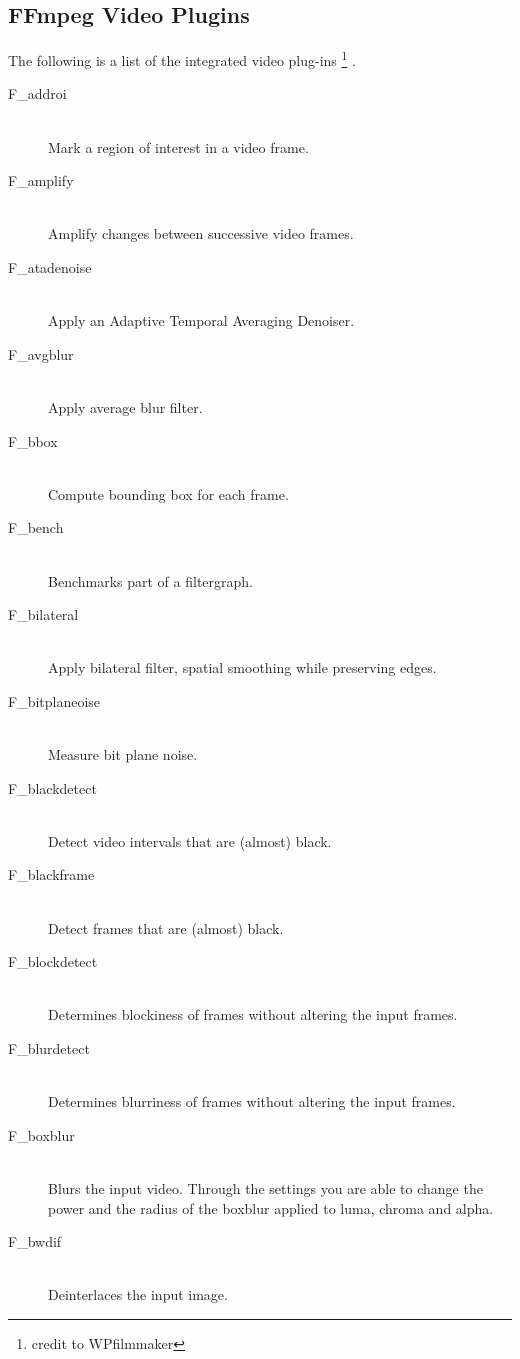 \subsection{FFmpeg Video Plugins}%
\label{sub:ffmpeg_video_plugins}

The following is a list of the integrated video plug-ins \protect\footnote{credit to WPfilmmaker} .
\begin{description}
\item [F\_addroi]~\\Mark a region of interest in a video frame.
\item [F\_amplify]~\\Amplify changes between successive video
  frames.
\item [F\_atadenoise]~\\Apply an Adaptive Temporal Averaging
  Denoiser.
\item [F\_avgblur]~\\Apply average blur filter.
\item [F\_bbox]~\\Compute bounding box for each frame.
\item [F\_bench]~\\Benchmarks part of a filtergraph.
\item [F\_bilateral]~\\Apply bilateral filter, spatial smoothing while preserving edges.
\item [F\_bitplaneoise]~\\Measure bit plane noise.
\item [F\_blackdetect]~\\Detect video intervals that are
  (almost) black.
\item [F\_blackframe]~\\Detect frames that are (almost) black.
\item [F\_blockdetect]~\\Determines blockiness of frames without altering the input frames.
\item [F\_blurdetect]~\\Determines blurriness of frames without altering the input frames.
\item [F\_boxblur]~\\Blurs the input video. Through the settings you are able to change the power and the radius of the boxblur applied to luma, chroma and alpha.
\item [F\_bwdif]~\\Deinterlaces the input image.

\end{description}
